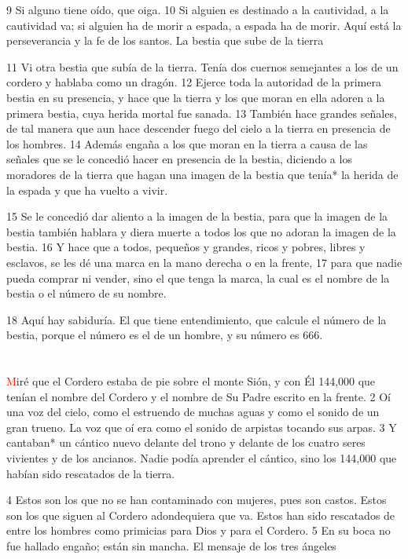 \documentclass[12pt,twocolumn,twoside]{book}
\begin{document}
9 Si alguno tiene oído, que oiga. 10 Si alguien es destinado a la cautividad, a la cautividad va; si alguien ha de morir a espada, a espada ha de morir. Aquí está la perseverancia y la fe de los santos.
La bestia que sube de la tierra

11 Vi otra bestia que subía de la tierra. Tenía dos cuernos semejantes a los de un cordero y hablaba como un dragón. 12 Ejerce toda la autoridad de la primera bestia en su presencia, y hace que la tierra y los que moran en ella adoren a la primera bestia, cuya herida mortal fue sanada. 13 También hace grandes señales, de tal manera que aun hace descender fuego del cielo a la tierra en presencia de los hombres. 14 Además engaña a los que moran en la tierra a causa de las señales que se le concedió hacer en presencia de la bestia, diciendo a los moradores de la tierra que hagan una imagen de la bestia que tenía* la herida de la espada y que ha vuelto a vivir.

15 Se le concedió dar aliento a la imagen de la bestia, para que la imagen de la bestia también hablara y diera muerte a todos los que no adoran la imagen de la bestia. 16 Y hace que a todos, pequeños y grandes, ricos y pobres, libres y esclavos, se les dé una marca en la mano derecha o en la frente, 17 para que nadie pueda comprar ni vender, sino el que tenga la marca, la cual es el nombre de la bestia o el número de su nombre.

18 Aquí hay sabiduría. El que tiene entendimiento, que calcule el número de la bestia, porque el número es el de un hombre, y su número es 666.
\chapter{}
\lettrine[lines=4]{\textcolor{red}{M}}{}iré que el Cordero estaba de pie sobre el monte Sión, y con Él 144,000 que tenían el nombre del Cordero y el nombre de Su Padre escrito en la frente. 2 Oí una voz del cielo, como el estruendo de muchas aguas y como el sonido de un gran trueno. La voz que oí era como el sonido de arpistas tocando sus arpas. 3 Y cantaban* un cántico nuevo delante del trono y delante de los cuatro seres vivientes y de los ancianos. Nadie podía aprender el cántico, sino los 144,000 que habían sido rescatados de la tierra.

4 Estos son los que no se han contaminado con mujeres, pues son castos. Estos son los que siguen al Cordero adondequiera que va. Estos han sido rescatados de entre los hombres como primicias para Dios y para el Cordero. 5 En su boca no fue hallado engaño; están sin mancha.
El mensaje de los tres ángeles
\end{document}
